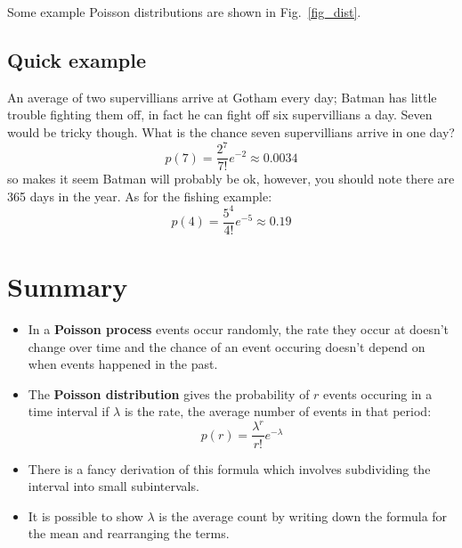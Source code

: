 \documentclass[11pt,a4paper]{scrartcl}
\begin{document}
Some example Poisson distributions are shown in Fig.~\ref{fig_dist}.

\subsection*{Quick example}

An average of two supervillians arrive at Gotham every day; Batman has
little trouble fighting them off, in fact he can fight off six
supervillians a day. Seven would be tricky though. What is the chance
seven supervillians arrive in one day?
\begin{equation}
p(7)=\frac{2^7}{7!}e^{-2}\approx 0.0034
\end{equation}
so makes it seem Batman will probably be ok, however, you should note
there are 365 days in the year. As for the fishing example:
\begin{equation}
p(4)=\frac{5^4}{4!}e^{-5}\approx 0.19
\end{equation}

\section*{Summary}

\begin{itemize}

\item In a \textbf{Poisson process} events occur randomly, the rate
  they occur at doesn't change over time and the chance of an event
  occuring doesn't depend on when events happened in the past.
  
  \item The \textbf{Poisson distribution} gives the probability of $r$
    events occuring in a time interval if $\lambda$ is the rate, the average number of events in that period:
\begin{equation}
p(r)=\frac{\lambda^r}{r!}e^{-\lambda}
\end{equation}    

\item There is a fancy derivation of this formula which involves subdividing the interval into small subintervals.

\item It is possible to show $\lambda$ is the average count by writing down the formula for the mean and rearranging the terms.
  \end{itemize}
\end{document}
